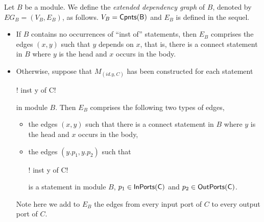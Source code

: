 {\begin{itemize}
Let $B$ be a module. We define the \emph{extended dependency graph} of $B$, denoted by $EG_B = (V_B, E_B)$, as follows. $V_B = \sf Cpnts(B)$ and $E_B$ is defined in the sequel.
\begin{itemize}
\item If $B$ contains no occurrences of ``inst of'' statements, then $E_B$ comprises the edges $(x, y)$ such that $y$ depends on $x$, that is, there is a connect statement in $B$ where $y$ is the head and $x$ occurs in the body.
%
\item Otherwise, suppose that $M_{(id.y, C)}$ has been constructed for each statement \begin{lstinline}! inst y of C!\end{lstinline} in module $B$. Then
$E_B$ comprises the following two types of edges,
\begin{itemize}
\item the edges $(x, y)$ such that there is a connect statement in $B$ where $y$ is the head and $x$ occurs in the body,
%
\item the edges $(y.p_1, y.p_2)$ such that \begin{lstinline}! inst y of C!\end{lstinline} is a  statement in module $B$, $p_1 \in \sf InPorts(C)$ and $p_2 \in \sf OutPorts(C)$.
\end{itemize}
Note here we add to $E_B$ the edges from every input port of $C$ to every output port of $C$.
\end{itemize}


\end{itemize}}
